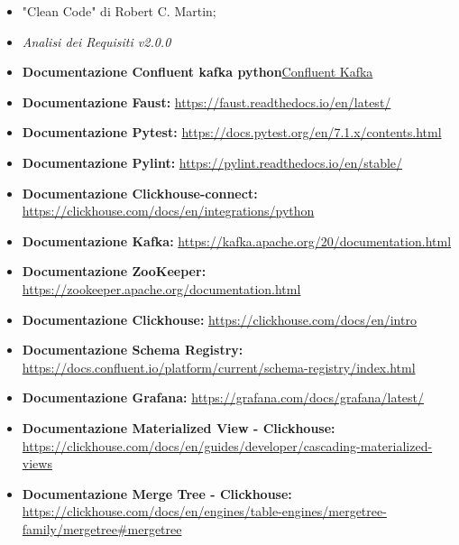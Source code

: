 \begin{itemize}
    \item "Clean Code" di Robert C. Martin;
    \item \textit{Analisi dei Requisiti v2.0.0}
    \item \textbf{Documentazione Confluent kafka python}\href{https://developer.confluent.io/get-started/python/}{Confluent Kafka}
    \item \textbf{Documentazione Faust:} \href{https://faust.readthedocs.io/en/latest/}{https://faust.readthedocs.io/en/latest/}
    \item \textbf{Documentazione Pytest:} \href{https://docs.pytest.org/en/7.1.x/contents.html}{https://docs.pytest.org/en/7.1.x/contents.html}
    \item \textbf{Documentazione Pylint:} \href{https://pylint.readthedocs.io/en/stable/}{https://pylint.readthedocs.io/en/stable/}
    \item \textbf{Documentazione Clickhouse-connect:} \href{https://clickhouse.com/docs/en/integrations/python}{https://clickhouse.com/docs/en/integrations/python}
    \item \textbf{Documentazione Kafka:} \href{https://kafka.apache.org/20/documentation.html}{https://kafka.apache.org/20/documentation.html}
    \item \textbf{Documentazione ZooKeeper:} \href{https://zookeeper.apache.org/documentation.html}{https://zookeeper.apache.org/documentation.html}
    \item \textbf{Documentazione Clickhouse:} \href{https://clickhouse.com/docs/en/intro}{https://clickhouse.com/docs/en/intro}
    \item \textbf{Documentazione Schema Registry:} \href{https://docs.confluent.io/platform/current/schema-registry/index.html}{https://docs.confluent.io/platform/current/schema-registry/index.html}
    \item \textbf{Documentazione Grafana:} \href{https://grafana.com/docs/grafana/latest/}{https://grafana.com/docs/grafana/latest/}
    \item \textbf{Documentazione Materialized View - Clickhouse:} \href{https://clickhouse.com/docs/en/guides/developer/cascading-materialized-views}{https://clickhouse.com/docs/en/guides/developer/cascading-materialized-views}
    \item \textbf{Documentazione Merge Tree - Clickhouse:} \href{https://clickhouse.com/docs/en/engines/table-engines/mergetree-family/mergetree#mergetree}{https://clickhouse.com/docs/en/engines/table-engines/mergetree-family/mergetree\#mergetree}

\end{itemize}
